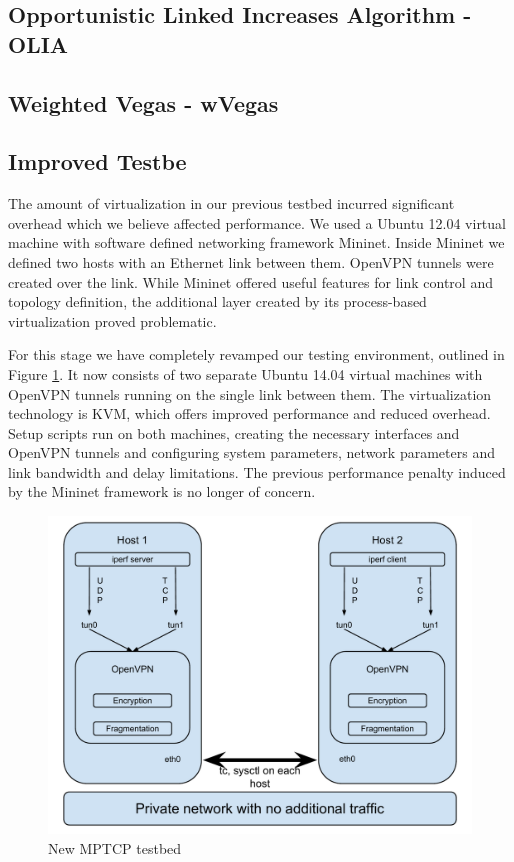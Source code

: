 \subsection{Opportunistic Linked Increases Algorithm - OLIA}
\subsection{Weighted Vegas - wVegas}
\subsection{Improved Testbe}
The amount of virtualization in our previous testbed incurred significant overhead which we believe affected performance. We used a Ubuntu 12.04 virtual machine with software defined networking framework Mininet. Inside Mininet we defined two hosts with an Ethernet link between them. OpenVPN tunnels were created over the link. While Mininet offered useful features for link control and topology definition, the additional layer created by its process-based virtualization proved problematic.

For this stage we have completely revamped our testing environment, outlined
in Figure \ref{fig:testbed}. It now
consists of two separate Ubuntu 14.04 virtual machines with OpenVPN tunnels
running on the single link between them. The virtualization technology is KVM,
which offers improved performance and reduced overhead. Setup scripts run on
both machines, creating the necessary interfaces and OpenVPN tunnels and
configuring system parameters, network parameters and link bandwidth and delay
limitations. The previous performance penalty induced by the Mininet
framework is no longer of concern.

\begin{figure}[h]
  \centering
  \includegraphics[width=\textwidth]{img/mptcp-openvpn-bare}
  \caption{New MPTCP testbed}
  \label{fig:testbed}
\end{figure}

